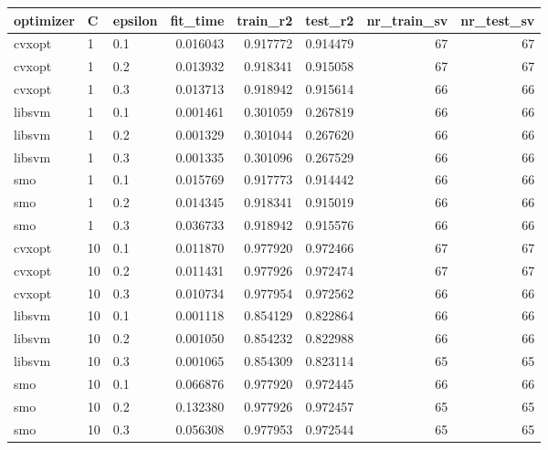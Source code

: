 \begin{tabular}{lllrrrrr}
\toprule
optimizer &   C & epsilon &  fit\_time &  train\_r2 &  test\_r2 &  nr\_train\_sv &  nr\_test\_sv \\
\midrule
   cvxopt &   1 &     0.1 &  0.016043 &  0.917772 & 0.914479 &           67 &          67 \\
   cvxopt &   1 &     0.2 &  0.013932 &  0.918341 & 0.915058 &           67 &          67 \\
   cvxopt &   1 &     0.3 &  0.013713 &  0.918942 & 0.915614 &           66 &          66 \\
   libsvm &   1 &     0.1 &  0.001461 &  0.301059 & 0.267819 &           66 &          66 \\
   libsvm &   1 &     0.2 &  0.001329 &  0.301044 & 0.267620 &           66 &          66 \\
   libsvm &   1 &     0.3 &  0.001335 &  0.301096 & 0.267529 &           66 &          66 \\
      smo &   1 &     0.1 &  0.015769 &  0.917773 & 0.914442 &           66 &          66 \\
      smo &   1 &     0.2 &  0.014345 &  0.918341 & 0.915019 &           66 &          66 \\
      smo &   1 &     0.3 &  0.036733 &  0.918942 & 0.915576 &           66 &          66 \\
   cvxopt &  10 &     0.1 &  0.011870 &  0.977920 & 0.972466 &           67 &          67 \\
   cvxopt &  10 &     0.2 &  0.011431 &  0.977926 & 0.972474 &           67 &          67 \\
   cvxopt &  10 &     0.3 &  0.010734 &  0.977954 & 0.972562 &           66 &          66 \\
   libsvm &  10 &     0.1 &  0.001118 &  0.854129 & 0.822864 &           66 &          66 \\
   libsvm &  10 &     0.2 &  0.001050 &  0.854232 & 0.822988 &           66 &          66 \\
   libsvm &  10 &     0.3 &  0.001065 &  0.854309 & 0.823114 &           65 &          65 \\
      smo &  10 &     0.1 &  0.066876 &  0.977920 & 0.972445 &           66 &          66 \\
      smo &  10 &     0.2 &  0.132380 &  0.977926 & 0.972457 &           65 &          65 \\
      smo &  10 &     0.3 &  0.056308 &  0.977953 & 0.972544 &           65 &          65 \\

\end{tabular}
